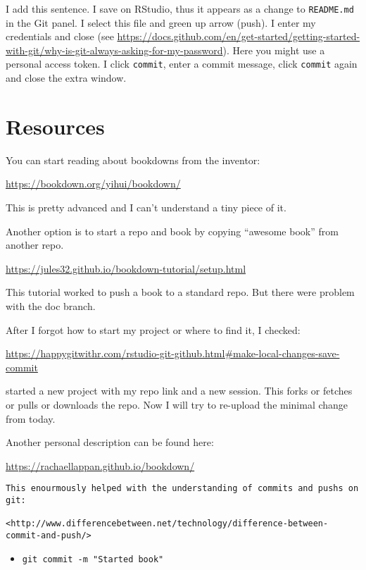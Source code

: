 \documentclass[
]{book}
\providecommand{\tightlist}{%
  \setlength{\itemsep}{0pt}\setlength{\parskip}{0pt}}
\begin{document}
I add this sentence. I save on RStudio, thus it appears as a change to \texttt{README.md} in the Git panel. I select this file and green up arrow (push). I enter my credentials and close (see \url{https://docs.github.com/en/get-started/getting-started-with-git/why-is-git-always-asking-for-my-password}). Here you might use a personal access token. I click \texttt{commit}, enter a commit message, click \texttt{commit} again and close the extra window.

\hypertarget{resources}{%
\section{Resources}\label{resources}}

You can start reading about bookdowns from the inventor:

\url{https://bookdown.org/yihui/bookdown/}

This is pretty advanced and I can't understand a tiny piece of it.

Another option is to start a repo and book by copying ``awesome book'' from another repo.

\url{https://jules32.github.io/bookdown-tutorial/setup.html}

This tutorial worked to push a book to a standard repo. But there were problem with the doc branch.

After I forgot how to start my project or where to find it, I checked:

\url{https://happygitwithr.com/rstudio-git-github.html\#make-local-changes-save-commit}

started a new project with my repo link and a new session. This forks or fetches or pulls or downloads the repo. Now I will try to re-upload the minimal change from today.

Another personal description can be found here:

\url{https://rachaellappan.github.io/bookdown/}

\begin{verbatim}
This enourmously helped with the understanding of commits and pushs on git:

<http://www.differencebetween.net/technology/difference-between-commit-and-push/>
\end{verbatim}

\begin{itemize}
\tightlist
\item
  \texttt{git\ commit\ -m\ "Started\ book"}
\end{itemize}
\end{document}
